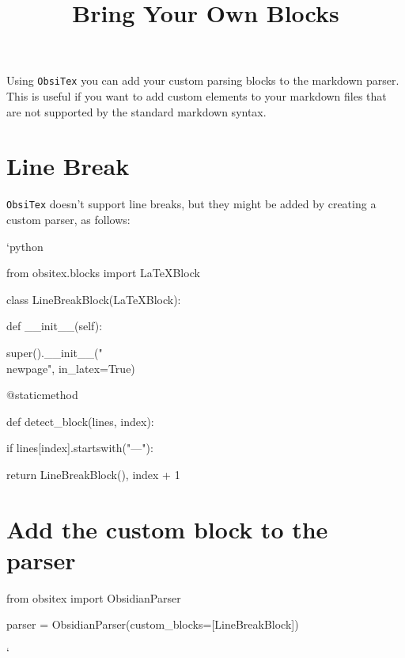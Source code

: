 \documentclass{article}
\begin{document}
\title{
    Bring Your Own Blocks
}
\date{}
\maketitle

Using \texttt{ObsiTex} you can add your custom parsing blocks to the markdown parser. This is useful if you want to add custom elements to your markdown files that are not supported by the standard markdown syntax.



\section{Line Break}\label{sec:Line_Break}



\texttt{ObsiTex} doesn't support line breaks, but they might be added by creating a custom parser, as follows:



\texttt{}`python

from obsitex.blocks import LaTeXBlock



class LineBreakBlock(LaTeXBlock):

    def \_\_init\_\_(self):

        super().\_\_init\_\_("\\newpage", in\_latex=True)



    @staticmethod

    def detect\_block(lines, index):

        if lines{[index]}.startswith("---"):

            return LineBreakBlock(), index + 1



\section{Add the custom block to the parser}\label{sec:Add_the_custom_block_to_the_parser}

from obsitex import ObsidianParser



parser = ObsidianParser(custom\_blocks={[LineBreakBlock]})

\texttt{}`
\end{document}
